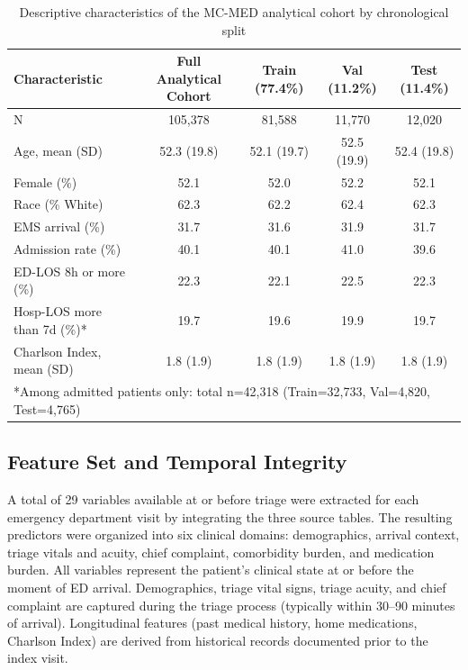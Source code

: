 \documentclass[harvard,article]{frontiersinFPHY_FAMS}
\begin{document}
\begin{table}[t]
\centering
\caption{Descriptive characteristics of the MC-MED analytical cohort by chronological split}
\label{tab:descriptive}
\begin{tabular}{lcccc}
\toprule
Characteristic & Full Analytical Cohort & Train (77.4\%) & Val (11.2\%) & Test (11.4\%) \\
\midrule
N & 105,378 & 81,588 & 11,770 & 12,020 \\
Age, mean (SD) & 52.3 (19.8) & 52.1 (19.7) & 52.5 (19.9) & 52.4 (19.8) \\
Female (\%) & 52.1 & 52.0 & 52.2 & 52.1 \\
Race (\% White) & 62.3 & 62.2 & 62.4 & 62.3 \\
EMS arrival (\%) & 31.7 & 31.6 & 31.9 & 31.7 \\
Admission rate (\%) & 40.1 & 40.1 & 41.0 & 39.6 \\
ED-LOS 8h or more (\%) & 22.3 & 22.1 & 22.5 & 22.3 \\
Hosp-LOS more than 7d (\%)* & 19.7 & 19.6 & 19.9 & 19.7 \\
Charlson Index, mean (SD) & 1.8 (1.9) & 1.8 (1.9) & 1.8 (1.9) & 1.8 (1.9) \\
\bottomrule
\multicolumn{5}{l}{*Among admitted patients only: total n=42,318 (Train=32,733, Val=4,820, Test=4,765)} \\
\end{tabular}
\end{table}

\subsection{Feature Set and Temporal Integrity}

A total of 29 variables available at or before triage were extracted for each emergency department visit by integrating the three source tables. The resulting predictors were organized into six clinical domains: demographics, arrival context, triage vitals and acuity, chief complaint, comorbidity burden, and medication burden. All variables represent the patient's clinical state at or before the moment of ED arrival. Demographics, triage vital signs, triage acuity, and chief complaint are captured during the triage process (typically within 30--90 minutes of arrival). Longitudinal features (past medical history, home medications, Charlson Index) are derived from historical records documented prior to the index visit.
\end{document}
